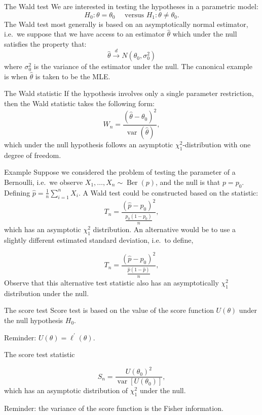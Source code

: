 \documentclass[
  ignorenonframetext,
]{beamer}
\begin{document}
\begin{frame}{The Wald test}
\protect{}\label{the-wald-test}
We are interested in testing the hypotheses in a parametric model: \[
H_{0}: \theta=\theta_{0} \quad \text { versus } H_{1}: \theta \neq \theta_{0} .
\] The Wald test most generally is based on an asymptotically normal
estimator, i.e.~we suppose that we have access to an estimator
\(\widehat{\theta}\) which under the null satisfies the property that:
\[
\widehat{\theta} \stackrel{d}{\rightarrow} N\left(\theta_0, \sigma_0^2\right)
\] where \(\sigma_0^2\) is the variance of the estimator under the null.
The canonical example is when \(\widehat{\theta}\) is taken to be the
MLE.
\end{frame}

\begin{frame}{The Wald statistic}
\protect{}\label{the-wald-statistic}
If the hypothesis involves only a single parameter restriction, then the
Wald statistic takes the following form: \[
W_n=\frac{\left(\hat{\theta}-\theta_0\right)^2}{\operatorname{var}(\hat{\theta})} ,
\] which under the null hypothesis follows an asymptotic
\(\chi^2_1\)-distribution with one degree of freedom.
\end{frame}

\begin{frame}{Example}
\protect{}\label{example-1}
Suppose we considered the problem of testing the parameter of a
Bernoulli, i.e.~we observe
\(X_1, \ldots, X_n \sim \operatorname{Ber}(p)\), and the null is that
\(p=p_0\). Defining \(\widehat{p}=\frac{1}{n} \sum_{i=1}^n X_i\). A Wald
test could be constructed based on the statistic: \[
T_n=\frac{(\widehat{p}-p_0)^2}{\frac{p_0\left(1-p_0\right)}{n}},
\] which has an asymptotic \(\chi^2_1\) distribution. An alternative
would be to use a slightly different estimated standard deviation,
i.e.~to define,

\[
T_n=\frac{(\widehat{p}-p_0)^2}{\frac{\widehat{p}\left(1-\widehat{p}\right)}{n}},
\] Observe that this alternative test statistic also has an
asymptotically \(\chi^2_1\) distribution under the null.
\end{frame}

\begin{frame}{The score test}
\protect{}\label{the-score-test}
Score test is based on the value of the score function \(U(\theta)\)
under the null hypothesis \(H_0\).

Reminder: \(U(\theta) = \ell^{\prime}(\theta)\).

The score test statistic

\[
S_n = \frac{U(\theta_0)^2}{\operatorname{var}[U(\theta_0)]},
\] which has an asymptotic distribution of \(\chi^2_1\) under the null.

Reminder: the variance of the score function is the Fisher information.
\end{frame}
\end{document}
